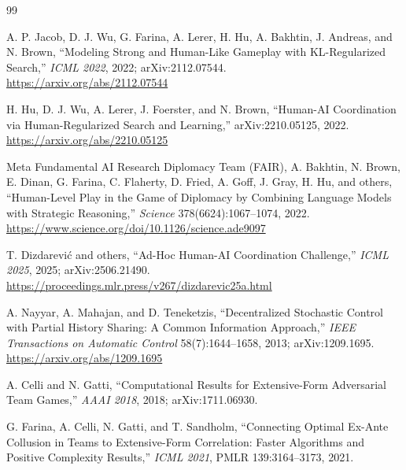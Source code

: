 \begin{thebibliography}{99}

A. P. Jacob, D. J. Wu, G. Farina, A. Lerer, H. Hu, A. Bakhtin, J. Andreas, and
N. Brown, ``Modeling Strong and Human-Like Gameplay with KL-Regularized
Search,'' \emph{ICML 2022}, 2022; arXiv:2112.07544.\\
\url{https://arxiv.org/abs/2112.07544}

H. Hu, D. J. Wu, A. Lerer, J. Foerster, and N. Brown, ``Human-AI Coordination
via Human-Regularized Search and Learning,'' arXiv:2210.05125, 2022.\\
\url{https://arxiv.org/abs/2210.05125}

Meta Fundamental AI Research Diplomacy Team (FAIR), A. Bakhtin, N. Brown,
E. Dinan, G. Farina, C. Flaherty, D. Fried, A. Goff, J. Gray, H. Hu, and others,
``Human-Level Play in the Game of Diplomacy by Combining Language Models with
Strategic Reasoning,'' \emph{Science} 378(6624):1067--1074, 2022.\\
\url{https://www.science.org/doi/10.1126/science.ade9097}

T. Dizdarevi\'c and others, ``Ad-Hoc Human-AI Coordination Challenge,''
\emph{ICML 2025}, 2025; arXiv:2506.21490.\\
\url{https://proceedings.mlr.press/v267/dizdarevic25a.html}


A. Nayyar, A. Mahajan, and D. Teneketzis, ``Decentralized Stochastic Control
with Partial History Sharing: A Common Information Approach,'' \emph{IEEE
Transactions on Automatic Control} 58(7):1644--1658, 2013; arXiv:1209.1695.\\
\url{https://arxiv.org/abs/1209.1695}

A. Celli and N. Gatti, ``Computational Results for Extensive-Form Adversarial
Team Games,'' \emph{AAAI 2018}, 2018; arXiv:1711.06930.

G. Farina, A. Celli, N. Gatti, and T. Sandholm, ``Connecting Optimal Ex-Ante
Collusion in Teams to Extensive-Form Correlation: Faster Algorithms and Positive
Complexity Results,'' \emph{ICML 2021}, PMLR 139:3164--3173, 2021.


\end{thebibliography}
